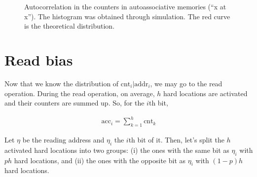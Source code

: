 \documentclass[12pt]{article}
\begin{document}
\begin{figure}[h!]
  \centering

  \caption{Autocorrelation in the counters in autoassociative memories (``x at x''). The histogram was obtained through simulation. The red curve is the theoretical distribution.}
  \label{fig:sdm-corr-prob}
\end{figure}



\section{Read bias}

Now that we know the distribution of $\text{cnt}_i | \text{addr}_i$, we may go to the read operation. During the read operation, on average, $h$ hard locations are activated and their counters are summed up. So, for the $i$th bit,

\begin{align}
\text{acc}_i = \sum_{k=1}^{h} \text{cnt}_k
\end{align}

Let $\eta$ be the reading address and $\eta_i$ the $i$th bit of it. Then, let's split the $h$ activated hard locations into two groups: (i) the ones with the same bit as $\eta_i$ with $ph$ hard locations, and (ii) the ones with the opposite bit as $\eta_i$ with $(1-p)h$ hard locations.
\end{document}
